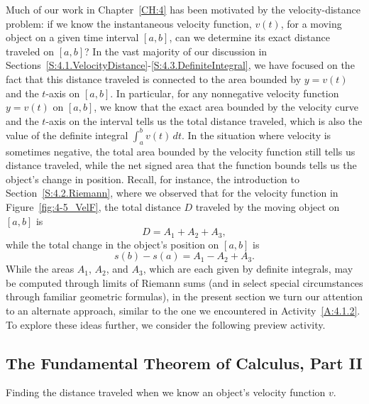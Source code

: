 Much of our work in Chapter~\ref{CH:4} has been motivated by the velocity-distance problem:  if we know the instantaneous velocity function, $v(t)$, for a moving object on a given time interval $[a,b]$, can we determine its exact distance traveled on $[a,b]$?  In the vast majority of our discussion in Sections~\ref{S:4.1.VelocityDistance}-\ref{S:4.3.DefiniteIntegral}, we have focused on the fact that this distance traveled is connected to the area bounded by $y = v(t)$ and the $t$-axis on $[a,b]$.  In particular, for any nonnegative velocity function $y = v(t)$ on $[a,b]$, we know that the exact area bounded by the velocity curve and the $t$-axis on the interval tells us the total distance traveled, which is also the value of the definite integral $\int_a^b v(t) \, dt$.  In the situation where velocity is sometimes negative, the total area bounded by the velocity function still tells us distance traveled, while the net signed area that the function bounds tells us the object's change in position.  Recall, for instance, the introduction to Section~\ref{S:4.2.Riemann}, where we observed that for the velocity function in Figure~\ref{fig:4-5_VelF}, the total distance $D$ traveled by the moving object on $[a,b]$ is 
\[ D = A_1 + A_2 + A_3, \]
while the total change in the object's position on $[a,b]$ is 
\[ s(b) - s(a) = A_1 - A_2 + A_3. \]
While the areas $A_1$, $A_2$, and $A_3$, which are each given by definite integrals, may be computed through limits of Riemann sums (and in select special circumstances through familiar geometric formulas), in the present section we turn our attention to an alternate approach, similar to the one we encountered in Activity~\ref{A:4.1.2}.  To explore these ideas further, we consider the following preview activity.


\subsection*{The Fundamental Theorem of Calculus, Part II} 

\begin{marginfigure}[2in] %
\caption{Finding the distance traveled when we know an object's velocity function $v$.} \label{fig:4-5_VelV}
\end{marginfigure}

